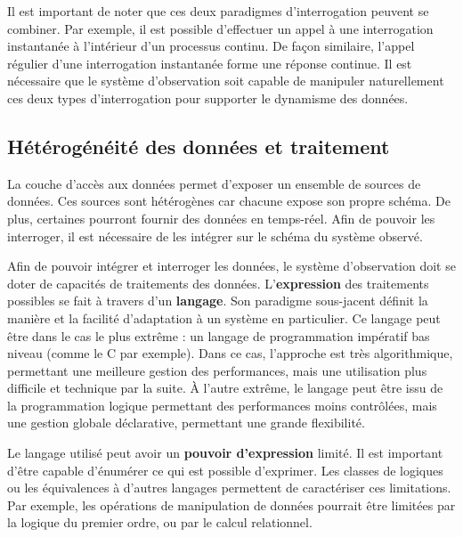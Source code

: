 Il est important de noter que ces deux paradigmes d'interrogation peuvent se combiner. Par exemple, il est possible d'effectuer un appel à une interrogation instantanée à l'intérieur d'un processus continu. De façon similaire, l'appel régulier d'une interrogation instantanée forme une réponse continue. Il est nécessaire que le système d'observation soit capable de manipuler naturellement ces deux types d'interrogation pour supporter le dynamisme des données.

\subsection{Hétérogénéité des données et traitement}
La couche d'accès aux données permet d'exposer un ensemble de sources de données. Ces sources sont hétérogènes car chacune expose son propre schéma. De plus, certaines pourront fournir des données en temps-réel. Afin de pouvoir les interroger, il est nécessaire de les intégrer sur le schéma du système observé.

Afin de pouvoir intégrer et interroger les données, le système d'observation doit se doter de capacités de traitements des données. L'\textbf{expression} des traitements possibles se fait à travers d'un \textbf{langage}. Son paradigme sous-jacent définit la manière et la facilité d'adaptation à un système en particulier. Ce langage peut être dans le cas le plus extrême : un langage de programmation impératif bas niveau (comme le C par exemple). Dans ce cas, l'approche est très algorithmique, permettant une meilleure gestion des performances, mais une utilisation plus difficile et technique par la suite. À l'autre extrême, le langage peut être issu de la programmation logique permettant des performances moins contrôlées, mais une gestion globale déclarative, permettant une grande flexibilité.

Le langage utilisé peut avoir un \textbf{pouvoir d'expression} limité. Il est important d'être capable d'énumérer ce qui est possible d'exprimer. Les classes de logiques ou les équivalences à d'autres langages permettent de caractériser ces limitations. Par exemple, les opérations de manipulation de données pourrait être limitées par la logique du premier ordre, ou par le calcul relationnel.

